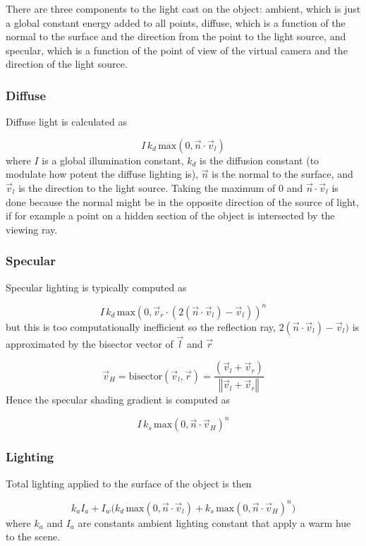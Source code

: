 \documentclass[12pt]{article}
\begin{document}
There are three components to the light cast on the object: ambient, which is just a global constant energy added to all points, diffuse, which is a function of the normal to the surface and the direction from the point to the light source, and specular, which is a function of the point of view of the virtual camera and the direction of the light source. 

\subsubsection{Diffuse}

Diffuse light is calculated as
 
$$I\, k_d\, \text{max}(0,\vec{n}\cdot\vec{v}_l)$$ 
where $I$ is a global illumination constant, $k_d$ is the diffusion constant (to modulate how potent the diffuse lighting is), $\vec{n}$ is the normal to the surface, and $\vec{v}_l$ is the direction to the light source. Taking the maximum of $0$ and $\vec{n}\cdot\vec{v}_l$ is done because the normal might be in the opposite direction of the source of light, if for example a point on a hidden section of the object is intersected by the viewing ray.

\subsubsection{Specular}

Specular lighting is typically computed as 

$$I\, k_d\, \text{max}(0,\vec{v}_r\cdot(2(\vec{n}\cdot\vec{v}_l)-\vec{v}_l))^n$$
but this is too computationally inefficient so the reflection ray, $2(\vec{n}\cdot\vec{v}_l)-\vec{v}_l)$ is approximated by the bisector vector of $\vec{l}$ and $\vec{r}$

$$\vec{v}_H = \text{bisector}(\vec{v}_l,\vec{r}) = \frac{(\vec{v}_l + \vec{v}_r)}{\left\Vert \vec{v}_l + \vec{v}_r \right\Vert} $$
Hence the specular shading gradient is computed as 

$$I\, k_s\, \text{max}(0,\vec{n}\cdot\vec{v}_H)^n$$

\subsubsection{Lighting}

Total lighting applied to the surface of the object is then

$$k_a I_a + I_w\Big(k_d\, \text{max}(0,\vec{n}\cdot\vec{v}_l) + k_s\, \text{max}(0,\vec{n}\cdot\vec{v}_H)^n\Big)$$
where $k_a$ and $I_a$ are constants ambient lighting constant that apply a warm hue to the scene. 
\end{document}
